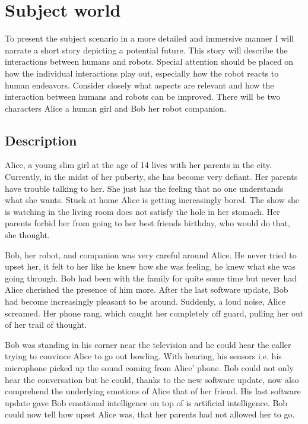 \documentclass{lncs}
\begin{document}
\setcounter{tocdepth}{3}
\tableofcontents
\newpage

\section{Subject world}\label{sec:Concept}

To present the subject scenario in a more detailed and immersive manner I will narrate a short story depicting a potential future. This story will describe the interactions between humans and robots. Special attention should be placed on how the individual interactions play out, especially how the robot reacts to human endeavors. Consider closely what aspects are relevant and how the interaction between humans and robots can be improved. There will be two characters Alice a human girl and Bob her robot companion.

\subsection{Description}

Alice, a young slim girl at the age of 14 lives with her parents in the city. Currently, in the midst of her puberty, she has become very defiant. Her parents have trouble talking to her. She just has the feeling that no one understands what she wants. Stuck at home Alice is getting increasingly bored. The show she is watching in the living room does not satisfy the hole in her stomach. Her parents forbid her from going to her best friends birthday, who would do that, she thought.

Bob, her robot, and companion was very careful around Alice. He never tried to upset her, it felt to her like he knew how she was feeling, he knew what she was going through. Bob had been with the family for quite some time but never had Alice cherished the presence of him more. After the last software update, Bob had become increasingly pleasant to be around. Suddenly, a loud noise, Alice screamed. Her phone rang, which caught her completely off guard, pulling her out of her trail of thought. 

Bob was standing in his corner near the television and he could hear the caller trying to convince Alice to go out bowling. With hearing, his sensors i.e. his microphone picked up the sound coming from Alice' phone. Bob could not only hear the conversation but he could, thanks to the new software update, now also comprehend the underlying emotions of Alice that of her friend. His last software update gave Bob emotional intelligence on top of is artificial intelligence. Bob could now tell how upset Alice was, that her parents had not allowed her to go.
\end{document}
